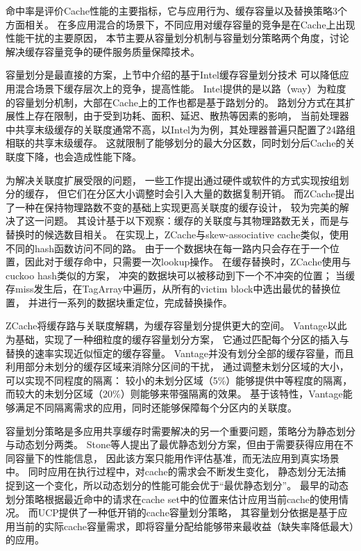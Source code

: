 命中率是评价Cache性能的主要指标，它与应用行为、缓存容量以及替换策略3个方面相关。
在多应用混合的场景下，不同应用对缓存容量的竞争是在Cache上出现性能干扰的主要原因，
本节主要从容量划分机制与容量划分策略两个角度，讨论解决缓存容量竞争的硬件服务质量保障技术。

容量划分是最直接的方案，上节中介绍的基于Intel缓存容量划分技术\cite{cook_hardware_2013}
可以降低应用混合场景下缓存层次上的竞争，提高性能。
Intel提供的是以路（way）为粒度的容量划分机制，大部在Cache上的工作也都是基于路划分的。%
路划分方式在其扩展性上存在限制，由于受到功耗、面积、延迟、散热等因素的影响，
当前处理器中共享末级缓存的关联度通常不高，以Intel为为例，其处理器普遍只配置了24路组相联的共享末级缓存。
这就限制了能够划分的最大分区数，同时划分后Cache的关联度下降，也会造成性能下降。

为解决关联度扩展受限的问题，
一些工作提出通过硬件\cite{Ranganathan:2000}或软件\cite{Lin:2008}的方式实现按组划分的缓存，
但它们在分区大小调整时会引入大量的数据复制开销。
而ZCache\cite{sanchez_zcache:_2010}提出了一种在保持物理路数不变的基础上实现更高关联度的缓存设计，
较为完美的解决了这一问题。
其设计基于以下观察：缓存的关联度与其物理路数无关，而是与替换时的候选数目相关。
在实现上，ZCache与skew-associative cache\cite{skewed-cache}类似，使用不同的hash函数访问不同的路。
由于一个数据块在每一路内只会存在于一个位置，因此对于缓存命中，只需要一次lookup操作。
在缓存替换时，ZCache使用与cuckoo hash\cite{cuckoo}类似的方案，
冲突的数据块可以被移动到下一个不冲突的位置；
当缓存miss发生后，在TagArray中遍历，从所有的victim block中选出最优的替换位置，
并进行一系列的数据块重定位，完成替换操作。

ZCache将缓存路与关联度解耦，为缓存容量划分提供更大的空间。
Vantage\cite{sanchez_vantage:_2011}以此为基础，实现了一种细粒度的缓存容量划分方案，
它通过匹配每个分区的插入与替换的速率实现近似恒定的缓存容量。
Vantage并没有划分全部的缓存容量，而且利用部分未划分的缓存区域来消除分区间的干扰，
通过调整未划分区域的大小，可以实现不同程度的隔离：
较小的未划分区域（5\%）能够提供中等程度的隔离，
而较大的未划分区域（20\%）则能够来带强隔离的效果。
基于该特性，Vantage能够满足不同隔离需求的应用，同时还能够保障每个分区内的关联度。

容量划分策略是多应用共享缓存时需要解决的另一个重要问题，策略分为静态划分与动态划分两类。
Stone等人提出了最优静态划分方案\cite{stone:1992}，但由于需要获得应用在不同容量下的性能信息，
因此该方案只能用作评估基准，而无法应用到真实场景中。
同时应用在执行过程中，对cache的需求会不断发生变化，
静态划分无法捕捉到这一个变化，所以动态划分的性能可能会优于``最优静态划分''。
最早的动态划分策略\cite{suh:2004}根据最近命中的请求在cache set中的位置来估计应用当前cache的使用情况。
而UCP\cite{qureshi_utility-based_2006}提供了一种低开销的cache容量划分策略，
其容量划分依据是基于应用当前的实际cache容量需求，即将容量分配给能够带来最收益（缺失率降低最大）的应用。

